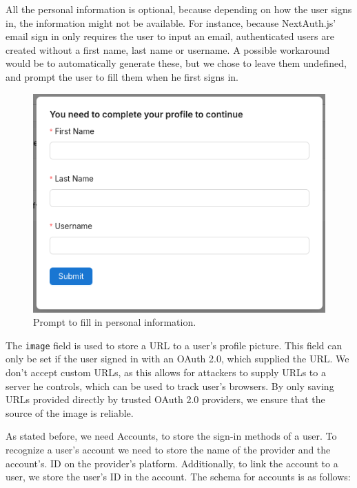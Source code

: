 All the personal information is optional, because depending on how the user signs in, the
information might not be available.
For instance, because NextAuth.js' email sign in only requires the user to input an
email, authenticated users are created without a first name, last name or username.
A possible workaround would be to automatically generate these, but we chose to leave them
undefined, and prompt the user to fill them when he first signs in.


\begin{figure}[H]
    \centering
    \includegraphics[scale=0.4]{images/fill-data-prompt.png}
    \caption{Prompt to fill in personal information.}
    \vspace{-1em} %
    \label{fig:prompt-fill-personal-information}
\end{figure}

The \lstinline{image} field is used to store a URL to a user's profile picture. This field
can only be set if the user signed in with an OAuth 2.0, which supplied
the URL.
We don't accept custom URLs, as this allows for attackers to supply URLs to a server he
controls, which can be used to track user's browsers.
By only saving URLs provided directly by trusted OAuth 2.0 providers, we ensure that the
source of the image is reliable.

As stated before, we need Accounts, to store the sign-in methods of a user.
To recognize a user's account we need to store the name of the provider and the account's.
ID on the provider's platform.
Additionally, to link the account to a user, we store the user's ID in the account.
The schema for accounts is as follows:

